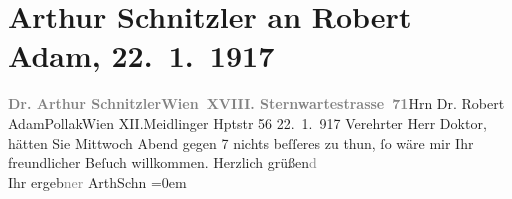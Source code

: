 

         
         \renewcommand{\erwaehntePersonen}{Personen: Robert Adam}
         \renewcommand{\erwaehnteOrte}{Orte: Meidlinger Hauptstraße, Sternwartestraße 71, Wien, XII., Meidling, XVIII., Währing}
         \renewcommand{\erwaehnteWerke}{}
               \section[Arthur Schnitzler an Robert Adam, 22. 1. 1917]{ Arthur Schnitzler an Robert Adam, 22. 1. 1917}\nopagebreak{}\rehead{ }\begin{ledgroupsized}[t]{13cm}\normalsize\beginnumbering{} \toendnotes[C]{\smallbreak\pagebreak[2]} 
\pstart{}{\pb}\textcolor{gray}{\textbf{Dr. Arthur Schnitzler}}\pend{}\pstart{}\textcolor{gray}{\textbf{Wien XVIII. Sternwartestrasse 71}}\pend{}{\bigskip}\pstart{}Hrn Dr. Robert Adam\pend{}\pstart{}Pollak\pend{}\pstart{}Wien XII.\pend{}\pstart{}Meidlinger Hptstr 56\pend{}{\bigskip}\pstart
           \raggedleft{}{\pb}22. 1. 917\pend
           \pstart{}Verehrter Herr Doktor, \pend\pstart
           hätten Sie Mittwoch{ }Abend gegen 7 nichts beſſeres zu thun, ſo wäre mir Ihr freundlicher
               Beſuch willkommen.\pend
           \pstart
           Herzlich grüßen\textcolor{gray}{d}{\\[\baselineskip]}Ihr ergeb\textcolor{gray}{ner}{ }\spacefill\mbox{ArthSchn}\pend
           \leftskip=0em{}
         
         \endnumbering{}\end{ledgroupsized}  \newcommand{\dateiname}{L02253}\newcommand{\titel}{Arthur Schnitzler an Robert Adam, 22. 1. 1917}\newcommand{\editorInnen}{Martin Anton Müller und Gerd-Hermann Susen}
      
